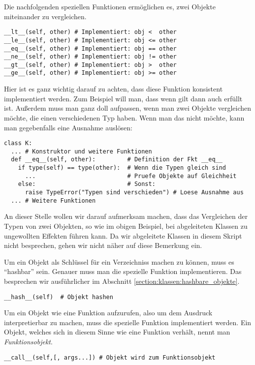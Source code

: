 Die nachfolgenden speziellen Funktionen ermöglichen es, zwei Objekte miteinander zu vergleichen.
\begin{lstlisting}
__lt__(self, other) # Implementiert: obj <  other
__le__(self, other) # Implementiert: obj <= other
__eq__(self, other) # Implementiert: obj == other
__ne__(self, other) # Implementiert: obj != other
__gt__(self, other) # Implementiert: obj >  other
__ge__(self, other) # Implementiert: obj >= other
\end{lstlisting}
Hier ist es ganz wichtig darauf zu achten, dass diese Funktion konsistent implementiert werden.
Zum Beispiel will man, dass wenn  gilt dann auch  erfüllt ist.
Außerdem muss man ganz doll aufpassen, wenn man zwei Objekte vergleichen möchte, die einen verschiedenen Typ haben.
Wenn man das nicht möchte, kann man gegebenfalls eine Ausnahme auslösen:
\begin{lstlisting}
class K:
  ... # Konstruktor und weitere Funktionen
  def __eq__(self, other):         # Definition der Fkt __eq__
    if type(self) == type(other):  # Wenn die Typen gleich sind
      ...                          # Pruefe Objekte auf Gleichheit
    else:                          # Sonst:
      raise TypeError("Typen sind verschieden") # Loese Ausnahme aus
  ... # Weitere Funktionen
\end{lstlisting}
An dieser Stelle wollen wir darauf aufmerksam machen, dass das Vergleichen der Typen von zwei Objekten, so wie im obigen Beispiel, bei abgeleiteten Klassen zu ungewollten Effekten führen kann.
Da wir abgeleitete Klassen in diesem Skript nicht besprechen, gehen wir nicht näher auf diese Bemerkung ein.

Um ein Objekt als Schlüssel für ein Verzeichniss machen zu können, muss es ``hash\-bar'' sein.
Genauer muss man die spezielle Funktion  implementieren.
Das besprechen wir ausführlicher im Abschnitt \ref{section:klassen:hashbare_objekte}.
\begin{lstlisting}
__hash__(self)  # Objekt hashen
\end{lstlisting}

Um ein Objekt  wie eine Funktion aufzurufen, also um dem Ausdruck  interpretierbar zu machen,
muss die spezielle Funktion  implementiert werden.
Ein Objekt, welches sich in diesem Sinne wie eine Funktion verhält, nennt man \emph{Funktionsobjekt}.
\begin{lstlisting}
__call__(self,[, args...]) # Objekt wird zum Funktionsobjekt
\end{lstlisting}

